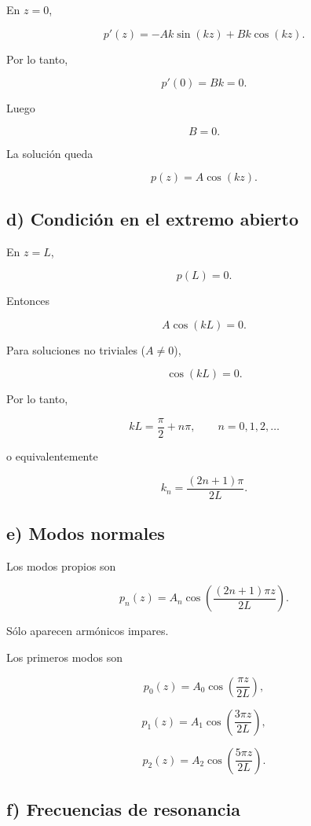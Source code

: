 \documentclass[11pt,spanish]{article}
\begin{document}
En \(z=0\),

\[
p'(z)
=
-Ak\sin(kz)
+
Bk\cos(kz).
\]

Por lo tanto,

\[
p'(0)=Bk=0.
\]

Luego

\[
\boxed{B=0.}
\]

La solución queda

\[
p(z)=A\cos(kz).
\]


\subsection*{d) Condición en el extremo abierto}

En \(z=L\),

\[
p(L)=0.
\]

Entonces

\[
A\cos(kL)=0.
\]

Para soluciones no triviales (\(A\neq0\)),

\[
\cos(kL)=0.
\]

Por lo tanto,

\[
kL=\frac{\pi}{2}+n\pi,
\qquad
n=0,1,2,\ldots
\]

o equivalentemente

\[
\boxed{
k_n
=
\frac{(2n+1)\pi}{2L}.
}
\]


\subsection*{e) Modos normales}

Los modos propios son

\[
\boxed{
p_n(z)
=
A_n
\cos\!\left(
\frac{(2n+1)\pi z}{2L}
\right).
}
\]

Sólo aparecen armónicos impares.

Los primeros modos son

\[
p_0(z)=A_0\cos\!\left(\frac{\pi z}{2L}\right),
\]

\[
p_1(z)=A_1\cos\!\left(\frac{3\pi z}{2L}\right),
\]

\[
p_2(z)=A_2\cos\!\left(\frac{5\pi z}{2L}\right).
\]


\subsection*{f) Frecuencias de resonancia}
\end{document}
